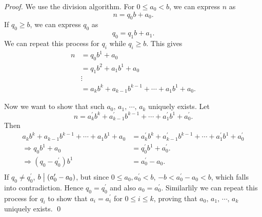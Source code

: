 \begin{proof}
    We use the division algorithm. For $0\leq a_0 < b$, we can express $n$ as
    \[
        n = q_0 b + a_0 .
    \]
    If $q_0 \geq b$, we can express $q_0$ as
    \[
        q_0 = q_1 b + a_1 .    
    \]
    We can repeat this process for $q_i$ while $q_i \geq b$. This gives
    \begin{align*}
        n &= q_0 b^1 + a_0 \\
        &= q_1 b^2 + a_1 b^1 + a_0 \\
        & \vdots \\
        &= a_kb^k + a_{k-1}b^{k-1} + \cdots + a_1b^1 + a_0. 
    \end{align*}

    Now we want to show that such $a_0,\, a_1,\, \cdots,\, a_k$ uniquely exists.
    Let
    \[
        n=a^\prime_kb^k + a^\prime_{k-1}b^{k-1} + \cdots + a^\prime_1b^1 + a^\prime_0.
    \]
    Then
    \begin{align*}
        a_kb^k + a_{k-1}b^{k-1} + \cdots + a_1b^1 + a_0&=a^\prime_kb^k + a^\prime_{k-1}b^{k-1} + \cdots + a^\prime_1b^1 + a^\prime_0\\
        \Rightarrow q_0b^1 + a_0&=q^\prime_0b^1 + a^\prime_0.\\
        \Rightarrow \left(q_0 - q^\prime_0\right)b^1 &= a^\prime_0 - a_0.\\
    \end{align*}
    If $q_0 \neq q^\prime_0$, $b \bigm| \left(a^\prime_0 - a_0\right)$, but since $0\leq a_0, a^\prime_0 < b$, $-b<a^\prime_0 - a_0<b$, 
    which falls into contradiction. Hence $q_0 = q^\prime_0$ and also $a_0 = a^\prime_0$. Similarlily we can repeat this process for
    $q_i$ to show that $a_i = a^\prime_i$ for $0 \leq i \leq k$, proving that $a_0,\, a_1,\, \cdots,\, a_k$ uniquely exists. \qed
\end{proof}


